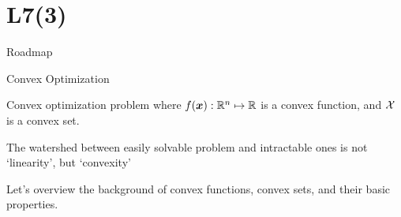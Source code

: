 \documentclass[handout,fleqn,aspectratio=169]{beamer}
\begin{document}
\section{L7(3)}
\begin{frame}{Roadmap}

\plitemsep 0.1in

\bce[(1)] 

\item {} 
\item {} 

\item {}
\item {}


\ece
\end{frame}

\begin{frame}{Convex Optimization}

\plitemsep 0.1in

\bci 

\item Convex optimization problem
where $f(\bm{x}): {\mathbb R}^{n} \mapsto {\mathbb R}$ is a convex function, and $\mathcal X$ is a convex set. 

\item The watershed between easily solvable problem and
intractable ones is not `linearity', but {\red `convexity'}

\item Let's overview the background of convex functions, convex sets, and their basic properties. 

\eci
\end{frame}
\end{document}
